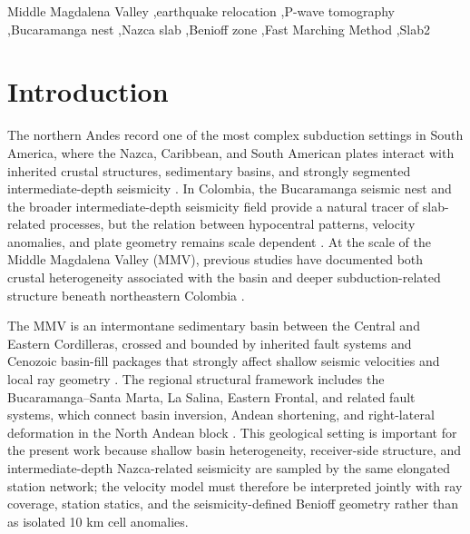\documentclass[review,authoryear]{elsarticle}
\begin{document}
\begin{frontmatter}
\begin{abstract}
\end{abstract}

\begin{keyword}
Middle Magdalena Valley \sep earthquake relocation \sep P-wave tomography \sep Bucaramanga nest \sep Nazca slab \sep Benioff zone \sep Fast Marching Method \sep Slab2
\end{keyword}

\end{frontmatter}

\section{Introduction}
The northern Andes record one of the most complex subduction settings in South America, where the Nazca, Caribbean, and South American plates interact with inherited crustal structures, sedimentary basins, and strongly segmented intermediate-depth seismicity \citep{Taboada2000,VanDerHilst1994,Syracuse2016,Schellart2023}. In Colombia, the Bucaramanga seismic nest and the broader intermediate-depth seismicity field provide a natural tracer of slab-related processes, but the relation between hypocentral patterns, velocity anomalies, and plate geometry remains scale dependent \citep{Zarifi2007,Londono2019,SepulvedaJaimes2018}. At the scale of the Middle Magdalena Valley (MMV), previous studies have documented both crustal heterogeneity associated with the basin and deeper subduction-related structure beneath northeastern Colombia \citep{OjedaHavskov2001,Poveda2018,Londono2020Velocity,LondonoRomero2017}.

The MMV is an intermontane sedimentary basin between the Central and Eastern Cordilleras, crossed and bounded by inherited fault systems and Cenozoic basin-fill packages that strongly affect shallow seismic velocities and local ray geometry \citep{MojicaFranco1990,GomezTapias2019}. The regional structural framework includes the Bucaramanga--Santa Marta, La Salina, Eastern Frontal, and related fault systems, which connect basin inversion, Andean shortening, and right-lateral deformation in the North Andean block \citep{MojicaFranco1990,Audemard2021,Londono2019}. This geological setting is important for the present work because shallow basin heterogeneity, receiver-side structure, and intermediate-depth Nazca-related seismicity are sampled by the same elongated station network; the velocity model must therefore be interpreted jointly with ray coverage, station statics, and the seismicity-defined Benioff geometry rather than as isolated 10 km cell anomalies.
\end{document}
